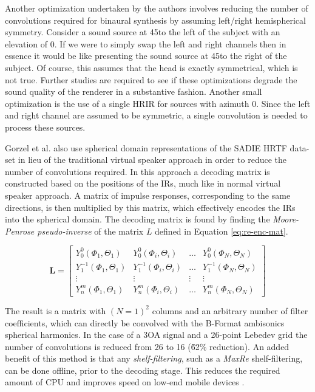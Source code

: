 Another optimization undertaken by the authors involves reducing the number of convolutions required for binaural synthesis by assuming left/right hemispherical symmetry. Consider a sound source at 45\textdegree to the left of the subject with an elevation of 0\textdegree. If we were to simply swap the left and right channels then in essence it would be like presenting the sound source at 45\textdegree to the right of the subject. Of course, this assumes that the head is exactly symmetrical, which is not true. Further studies are required to see if these optimizations degrade the sound quality of the renderer in a substantive fashion. Another small optimization is the use of a single HRIR for sources with azimuth 0. Since the left and right channel are assumed to be symmetric, a single convolution is needed to process these sources. 

Gorzel et al. also use spherical domain representations of the SADIE HRTF data-set in lieu of the traditional virtual speaker approach in order to reduce the number of convolutions required. In this approach a decoding matrix is constructed based on the positions of the IRs, much like in normal virtual speaker approach. A matrix of impulse responses, corresponding to the same directions, is then multiplied by this matrix, which effectively encodes the IRs into the spherical domain. The decoding matrix is found by finding the \textit{Moore-Penrose pseudo-inverse} of the matrix $L$ defined in Equation \ref{eq:re-enc-mat}. 

\begin{equation}
\mathbf{L}=\left[\begin{array}{cccc}
Y_{0}^{0}\left(\Phi_{1}, \Theta_{1}\right) & Y_{0}^{0}\left(\Phi_{i}, \Theta_{i}\right) & \ldots & Y_{0}^{0}\left(\Phi_{N}, \Theta_{N}\right) \\
Y_{1}^{-1}\left(\Phi_{1}, \Theta_{1}\right) & Y_{1}^{-1}\left(\Phi_{i}, \Theta_{i}\right) & \ldots & Y_{1}^{-1}\left(\Phi_{N}, \Theta_{N}\right) \\
\vdots & \vdots & \vdots & \vdots \\
Y_{n}^{m}\left(\Phi_{1}, \Theta_{1}\right) & Y_{n}^{m}\left(\Phi_{i}, \Theta_{i}\right) & \ldots & Y_{n}^{m}\left(\Phi_{N}, \Theta_{N}\right)
\end{array}\right]
\label{eq:re-enc-mat}
\end{equation}


The result is a matrix with $(N=1)^2$ columns and an arbitrary number of filter coefficients, which can directly be convolved with the B-Format ambisonics spherical harmonics. In the case of a 3OA signal and a 26-point Lebedev grid the number of convolutions is reduced from 26 to 16 (\~62\% reduction). An added benefit of this method is that any \textit{shelf-filtering}, such as a \textit{MaxRe} shelf-filtering, can be done offline, prior to the decoding stage. This reduces the required amount of CPU and improves speed on low-end mobile devices \cite{gorzel2019efficient}.

